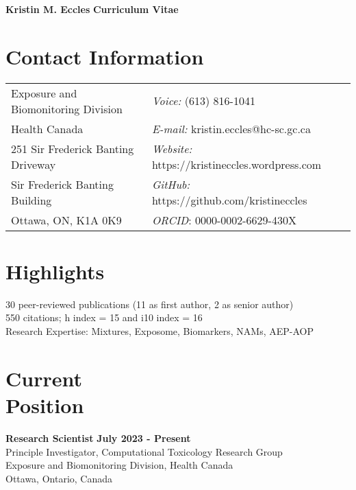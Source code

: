 \documentclass[margin,line]{res}
\begin{document}
\begin{flushleft}
		\huge \textbf{Kristin M. Eccles}
		\hfill {\LARGE \textbf{Curriculum Vitae}}\\
\end{flushleft}

\begin{resume}

\section{\sc Contact Information}
\vspace{.05in}
\begin{tabular}{@{}p{3.2in}p{2.5in}}
Exposure and Biomonitoring Division & {\it Voice:}  (613) 816-1041 \\
Health Canada & {\it E-mail:}  kristin.eccles@hc-sc.gc.ca\\
251 Sir Frederick Banting Driveway&{\it Website:} https://kristineccles.wordpress.com  \\
Sir Frederick Banting Building&{\it GitHub:} https://github.com/kristineccles \\
Ottawa, ON, K1A 0K9 & {\it ORCID}: 0000-0002-6629-430X

\end{tabular}

\vspace*{.1in}
\section{\sc Highlights}
30 peer-reviewed publications (11 as first author, 2 as senior author)
\\
550 citations; h index = 15 and i10 index = 16
\\
Research Expertise: Mixtures, Exposome, Biomarkers, NAMs, AEP-AOP

\vspace*{.1in}
\section{\sc Current\\Position}
{\bf  Research Scientist} \hfill {\bf July 2023 - Present}\\
Principle Investigator, Computational Toxicology Research Group\\
Exposure and Biomonitoring Division, Health Canada\\
Ottawa, Ontario, Canada

\vspace*{.1in}

\end{resume}
\end{document}
